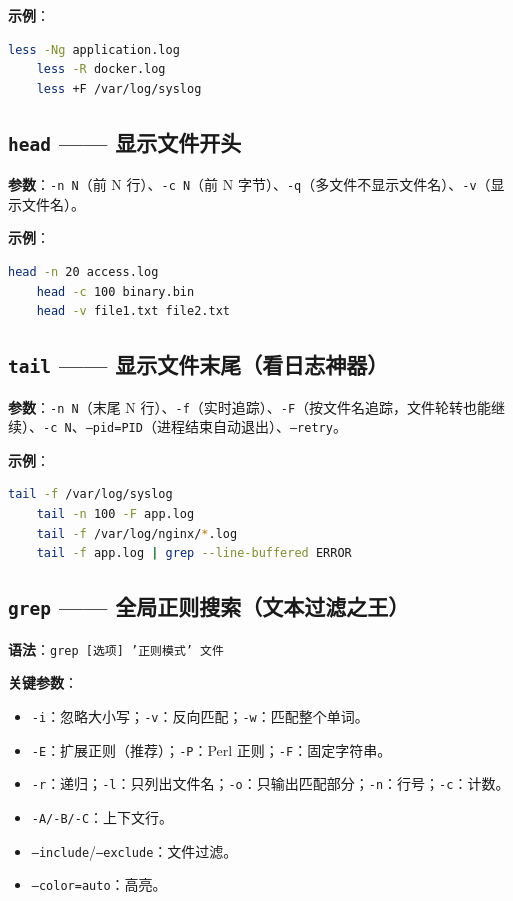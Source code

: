 \textbf{示例}：
\begin{lstlisting}[language=bash]
	less -Ng application.log
	less -R docker.log
	less +F /var/log/syslog
\end{lstlisting}

\subsection{\texttt{head} —— 显示文件开头} \textbf{参数}：\texttt{-n N}（前 N 行）、\texttt{-c N}（前 N 字节）、\texttt{-q}（多文件不显示文件名）、\texttt{-v}（显示文件名）。

\textbf{示例}：
\begin{lstlisting}[language=bash]
	head -n 20 access.log
	head -c 100 binary.bin
	head -v file1.txt file2.txt
\end{lstlisting}

\subsection{\texttt{tail} —— 显示文件末尾（看日志神器）} \textbf{参数}：\texttt{-n N}（末尾 N 行）、\texttt{-f}（实时追踪）、\texttt{-F}（按文件名追踪，文件轮转也能继续）、\texttt{-c N}、\texttt{--pid=PID}（进程结束自动退出）、\texttt{--retry}。

\textbf{示例}：
\begin{lstlisting}[language=bash]
	tail -f /var/log/syslog
	tail -n 100 -F app.log
	tail -f /var/log/nginx/*.log
	tail -f app.log | grep --line-buffered ERROR
\end{lstlisting}

\subsection{\texttt{grep} —— 全局正则搜索（文本过滤之王）} \textbf{语法}：\texttt{grep [选项] '正则模式' 文件}

\textbf{关键参数}：
\begin{itemize}
\item \texttt{-i}：忽略大小写；\texttt{-v}：反向匹配；\texttt{-w}：匹配整个单词。
\item \texttt{-E}：扩展正则（推荐）；\texttt{-P}：Perl 正则；\texttt{-F}：固定字符串。
\item \texttt{-r}：递归；\texttt{-l}：只列出文件名；\texttt{-o}：只输出匹配部分；\texttt{-n}：行号；\texttt{-c}：计数。
\item \texttt{-A/-B/-C}：上下文行。
\item \texttt{--include}/\texttt{--exclude}：文件过滤。
\item \texttt{--color=auto}：高亮。
\end{itemize}

